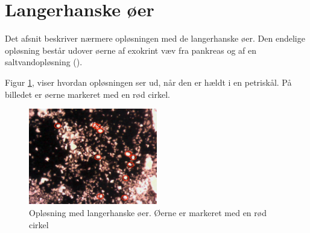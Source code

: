 %
%
%
%
%


\section{Langerhanske øer}
Det afsnit beskriver nærmere opløsningen med de langerhanske øer. Den endelige opløsning består udover øerne af exokrint væv fra pankreas og af en saltvandopløsning (\cite{hbbs}). 

Figur \ref{fig:islet}, viser hvordan opløsningen ser ud, når den er hældt i en petriskål. På billedet er øerne markeret med en rød cirkel.

\begin{figure}[H]
	\centering
	\includegraphics[width=0.5\textwidth]{billeder/software/sgbillede.png}
	\caption{Opløsning med langerhanske øer. Øerne er markeret med en rød cirkel}
	\label{fig:islet}
\end{figure}

